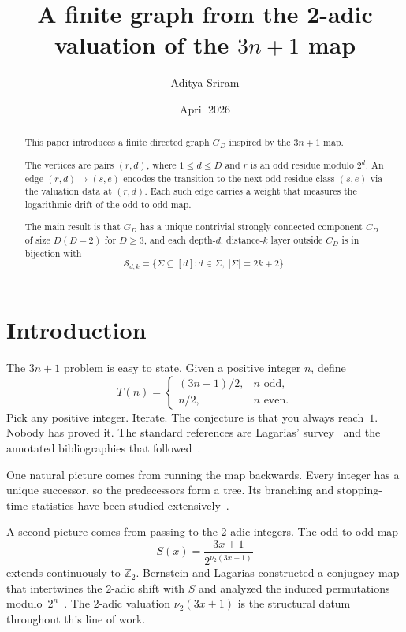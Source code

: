 \documentclass[11pt]{amsart}
\title{A finite graph from the 2-adic valuation of the \texorpdfstring{$3n+1$}{3n+1} map}
\author{Aditya Sriram}
\date{April 2026}
\theoremstyle{definition}
\theoremstyle{remark}
\newcommand{\Sfam}{\mathcal S}
\begin{document}
\begin{abstract}
\setlength{\parskip}{0.6em} 
\setlength{\parindent}{0pt} 

This paper introduces a finite directed graph $G_D$ inspired by the $3n+1$ map.

The vertices are pairs $(r,d)$, where $1\le d\le D$ and $r$ is an odd 
residue modulo $2^d$. An edge $(r,d) \longrightarrow (s,e)$ encodes the
transition to the next odd residue class $(s,e)$ via the valuation data 
at $(r,d)$. Each such edge carries a weight that measures the logarithmic 
drift of the odd-to-odd map.

The main result is that $G_D$ has a unique nontrivial strongly connected
component $C_D$ of size $D(D-2)$ for $D\ge 3$, and each depth-$d$,
distance-$k$ layer outside $C_D$ is in bijection with 
\[
\Sfam_{d,k} = \{\Sigma\subseteq[d] : d\in\Sigma,\ |\Sigma|=2k+2\}.
\]
\end{abstract}
\maketitle


\section{Introduction}\label{sec:introduction}
The $3n+1$ problem is easy to state.  Given a positive integer $n$, define
\[
T(n)=
\begin{cases}
(3n+1)/2, & n\text{ odd},\\
n/2, & n\text{ even}.
\end{cases}
\]
Pick any positive integer.  Iterate.  The conjecture is that you always
reach~$1$.  Nobody has proved it.  The standard references are Lagarias'
survey~\cite{Lagarias1985} and the annotated bibliographies that
followed~\cite{LagariasAnnotated1999, LagariasAnnotated2009, Lagarias2010}.

One natural picture comes from running the map backwards.  Every integer has a
unique successor, so the predecessors form a tree.  Its branching and
stopping-time statistics have been studied
extensively~\cite{ApplegateLagarias1995, ApplegateLagarias2003, Wirsching1998}.

A second picture comes from passing to the $2$-adic integers.  The odd-to-odd
map
\[
S(x)=\frac{3x+1}{2^{\nu_2(3x+1)}}
\]
extends continuously to $\mathbb{Z}_2$.  Bernstein and Lagarias constructed a
conjugacy map that intertwines the $2$-adic shift with $S$ and analyzed the
induced permutations modulo~$2^n$~\cite{Bernstein1994,
BernsteinLagarias1996}.  The $2$-adic valuation $\nu_2(3x+1)$ is the
structural datum throughout this line of work.
\end{document}
